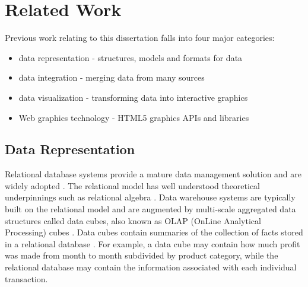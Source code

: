\pagebreak
\section{Related Work}
Previous work relating to this dissertation falls into four major categories:
\begin{itemize}
\item data representation - structures, models and formats for data
\item data integration - merging data from many sources
\item data visualization - transforming data into interactive graphics
\item Web graphics technology - HTML5 graphics APIs and libraries
\end{itemize}
\subsection{Data Representation}
%
%
Relational database systems provide a mature data management solution and are widely adopted \cite{ramakrishnan2000database}. The relational model has well understood theoretical underpinnings such as relational algebra \cite{clifford1985algebra}. Data warehouse systems are typically built on the relational model and are augmented by multi-scale aggregated data structures called data cubes, also known as OLAP (OnLine Analytical Processing) cubes \cite{gray1997data, codd1993providing}. Data cubes contain summaries of the collection of facts stored in a relational database \cite{chaudhuri1997overview}. For example, a data cube may contain how much profit was made from month to month subdivided by product category, while the relational database may contain the information associated with each individual transaction.

